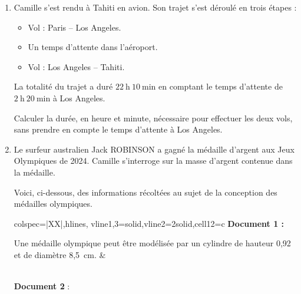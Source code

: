 \documentclass[12pt,a4paper,french]{article}
\begin{document}
\begin{enumerate}
\item Camille s'est rendu à Tahiti en avion. Son trajet s'est déroulé en trois étapes :
\begin{itemize}
\item Vol  : Paris – Los Angeles.
\item Un temps d'attente dans l'aéroport.
\item Vol  : Los Angeles – Tahiti.
\end{itemize}
La totalité du trajet a duré $22\ \text{h}\ 10\ \text{min}$ en comptant le temps d'attente de $2\ \text{h}\ 20\ \text{min}$ à Los Angeles.

Calculer la durée, en heure et minute, nécessaire pour effectuer les deux vols, sans prendre en compte le temps d'attente à Los Angeles.

\item Le surfeur australien Jack ROBINSON a gagné la médaille d'argent aux Jeux Olympiques de 2024. Camille s'interroge sur la masse d'argent contenue dans la médaille.

Voici, ci-dessous, des informations récoltées au sujet de la conception des médailles olympiques.

\medskip
\begin{tblr}{colspec={|XX|},hlines, vline{1,3}={solid},vline{2}={2}{solid},cell{1}{2}={c}}
\textbf{Document 1 :}

Une médaille olympique peut être modélisée par un cylindre de hauteur 0{,}92\  et de diamètre 8{,}5\ cm. &
\\
\textbf{Document 2} :


\end{tblr}
\end{enumerate}
\end{document}
